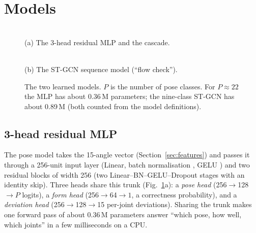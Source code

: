 \section{Models}\label{sec:models}
\begin{figure}[t]
\centering
\begin{minipage}[b]{0.50\textwidth}\centering
\resizebox{\linewidth}{!}{}\\[2pt]
{\footnotesize (a) The 3-head residual MLP and the cascade.}
\end{minipage}\hfill
\begin{minipage}[b]{0.47\textwidth}\centering
\resizebox{\linewidth}{!}{}\\[2pt]
{\footnotesize (b) The ST-GCN sequence model (``flow check'').}
\end{minipage}
\caption{The two learned models. $P$ is the number of pose classes. For $P\approx22$ the MLP has about 0.36\,M parameters; the nine-class ST-GCN has about 0.89\,M (both counted from the model definitions).}
\label{fig:models}
\end{figure}

\subsection{3-head residual MLP}
The pose model takes the 15-angle vector (Section~\ref{sec:features}) and passes it through a 256-unit input layer (Linear, batch normalisation \cite{ioffe2015bn}, GELU \cite{hendrycks2016gelu}) and two residual blocks \cite{he2016resnet} of width 256 (two Linear--BN--GELU--Dropout stages with an identity skip). Three heads share this trunk (Fig.~\ref{fig:models}a): a \emph{pose head} (256$\to$128$\to P$ logits), a \emph{form head} (256$\to$64$\to1$, a correctness probability), and a \emph{deviation head} (256$\to$128$\to$15 per-joint deviations). Sharing the trunk makes one forward pass of about 0.36\,M parameters answer ``which pose, how well, which joints'' in a few milliseconds on a CPU.

